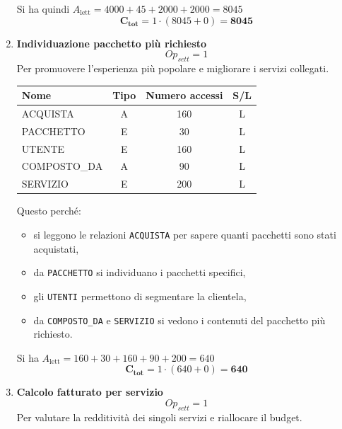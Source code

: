 \documentclass[a4paper,12pt]{report}
\begin{document}
\begin{enumerate}
	      Si ha quindi $A_{\text{lett}} = 4000 + 45 + 2000 + 2000 = 8045$
	      $$\mathbf{C_{tot}} = 1 \cdot (8045 + 0) = \mathbf{8045}$$


	\item {\large \textbf{Individuazione pacchetto più richiesto}} \label{op21}
	      $$
		      {Op}_{sett} = 1
	      $$
	      Per promuovere l'esperienza più popolare e migliorare i servizi collegati.

	      \begin{table}[H]
		      \centering
		      \small
		      \renewcommand{\arraystretch}{1.15}
		      \begin{tabularx}{0.8\textwidth}{|X|c|c|c|}
			      \hline
			      \rowcolor{gray!20}
			      \textbf{Nome} & \textbf{Tipo} & \textbf{Numero accessi} & \textbf{S/L} \\
			      \hline
			      ACQUISTA      & A             & 160                     & L            \\
			      PACCHETTO     & E             & 30                      & L            \\
			      UTENTE        & E             & 160                     & L            \\
			      COMPOSTO\_DA  & A             & 90                      & L            \\
			      SERVIZIO      & E             & 200                     & L            \\
			      \hline
		      \end{tabularx}
	      \end{table}

	      Questo perché:
	      \begin{itemize}
		      \item si leggono le relazioni \texttt{ACQUISTA} per sapere quanti pacchetti sono stati acquistati,
		      \item da \texttt{PACCHETTO} si individuano i pacchetti specifici,
		      \item gli \texttt{UTENTI} permettono di segmentare la clientela,
		      \item da \texttt{COMPOSTO\_DA} e \texttt{SERVIZIO} si vedono i contenuti del pacchetto più richiesto.
	      \end{itemize}

	      Si ha $A_{\text{lett}} = 160 + 30 + 160 + 90 + 200 = 640$
	      $$\mathbf{C_{tot}} = 1 \cdot (640 + 0) = \mathbf{640}$$


	\item {\large \textbf{Calcolo fatturato per servizio}} \label{op22}
	      $$
		      {Op}_{sett} = 1
	      $$
	      Per valutare la redditività dei singoli servizi e riallocare il budget.


\end{enumerate}
\end{document}
